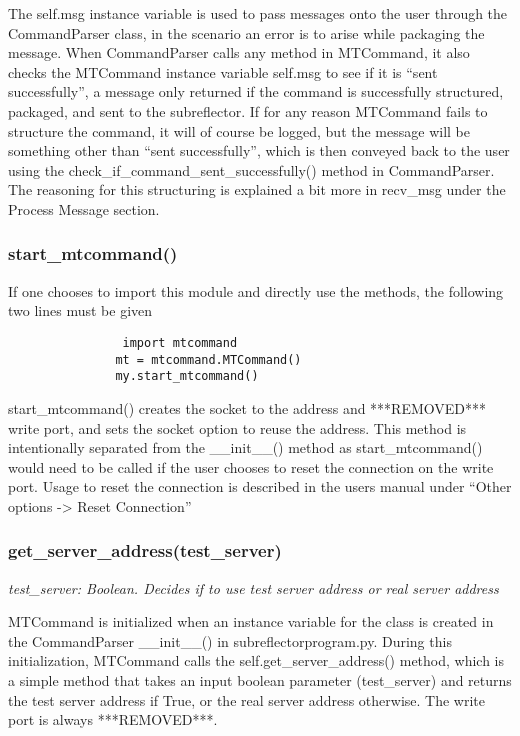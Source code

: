 \documentclass{article}
\begin{document}
\vspace{10pt}
The self.msg instance variable is used to pass messages onto the user through the CommandParser class, in the scenario an error is to arise while packaging the message. When CommandParser calls any method in MTCommand, it also checks the MTCommand instance variable self.msg to see if it is ``sent successfully'', a message only returned if the command is successfully structured, packaged, and sent to the subreflector. If for any reason MTCommand fails to structure the command, it will of course be logged, but the message will be something other than ``sent successfully'', which is then conveyed back to the user using the check\_if\_command\_sent\_successfully() method in CommandParser.  The reasoning for this structuring is explained a bit more in recv\_msg under the Process Message section.



\subsubsection{start\_mtcommand()}
If one chooses to import this module and directly use the methods, the following two lines must be given
    \begin{lstlisting}
    		    import mtcommand
               mt = mtcommand.MTCommand()
               my.start_mtcommand()
    \end{lstlisting}

start\_mtcommand() creates the socket to the address and ***REMOVED*** write port, and sets the socket option to reuse the address. This method is intentionally separated from the \_\_init\_\_() method as  start\_mtcommand() would need to be called if the user chooses to reset the connection on the write port. Usage to reset the connection is described in the users manual under ``Other options -> Reset Connection''

\subsubsection{get\_server\_address(test\_server)}
\emph{test\_server:  Boolean. Decides if to use test server address or real server address}
\vspace{10pt}

MTCommand is initialized when an instance variable for the class is created in the CommandParser \_\_init\_\_() in subreflector\-program.py. During this initialization, MTCommand calls the self.get\_server\_address() method, which is a simple method that takes an input boolean parameter (test\_server) and returns the test  server address if True, or the real server address otherwise. The write port is always ***REMOVED***.
\end{document}
